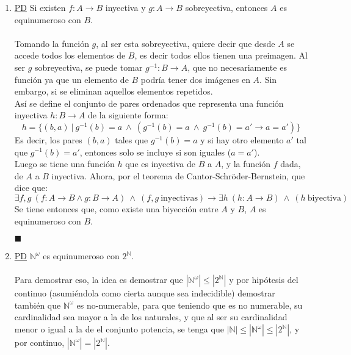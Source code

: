 \documentclass[letter]{article}
\begin{document}
	\begin{pregunta}{2}
		\begin{enumerate}
		\item \underline{PD} Si existen $f: A \rightarrow B$ inyectiva y $g: A \rightarrow B$ sobreyectiva, entonces $A$ es equinumeroso con $B$.\\\\
		Tomando la función $g$, al ser esta sobreyectiva, quiere decir que desde $A$ se accede todos los elementos de $B$, es decir todos ellos tienen una preimagen. Al ser $g$ sobreyectiva, se puede tomar $g^{-1}: B \rightarrow A$, que no necesariamente es función ya que un elemento de $B$ podría tener dos imágenes en $A$. Sin embargo, si se eliminan aquellos elementos repetidos.\\
		Así se define el conjunto de pares ordenados que representa una función inyectiva $h: B \rightarrow A$ de la siguiente forma:
		$$h=\{(b,a)\ |\ g^{-1}(b)=a\ \wedge\ (g^{-1}(b)=a\ \wedge \ g^{-1}(b)=a' \rightarrow a=a')\}$$
		Es decir, los pares $(b, a)$ tales que $g^{-1}(b)=a$ y si hay otro elemento $a'$ tal que $g^{-1}(b)=a'$, entonces solo se incluye si son iguales ($a=a'$).\\
		Luego se tiene una función $h$ que es inyectiva de $B$ a $A$, y la función $f$ dada, de $A$ a $B$ inyectiva. Ahora, por el teorema de Cantor-Schröder-Bernstein, que dice que:
		$$\exists f,g\ (f:A\to B\wedge g:B\to A)\ \wedge \ (f,g\ \text{inyectivas}) \rightarrow \exists h\ (h:A\to B)\ \wedge \ (h\ \text{biyectiva})$$
		Se tiene entonces que, como existe una biyección entre $A$ y $B$, $A$ es equinumeroso con $B$.
		\begin{flushright}$\blacksquare$\end{flushright}
		\item \underline{PD} $\mathbb{N}^\omega$ es equinumeroso con $2^\mathbb{N}$.\\\\
		Para demostrar eso, la idea es demostrar que $|\mathbb{N}^\omega| \leq |2^\mathbb{N}|$ y por hipótesis del continuo (asumiéndola como cierta aunque sea indecidible) demostrar también que $\mathbb{N}^\omega$ es no-numerable, para que teniendo que es no numerable, su cardinalidad sea mayor a la de los naturales, y que al ser su cardinalidad menor o igual a la de el conjunto potencia, se tenga que $|\mathbb{N}| \le |\mathbb{N}^\omega| \leq |2^\mathbb{N}|$, y por continuo, $|\mathbb{N}^\omega| = |2^\mathbb{N}|$.\\\\

\end{enumerate}
\end{pregunta}
\end{document}
